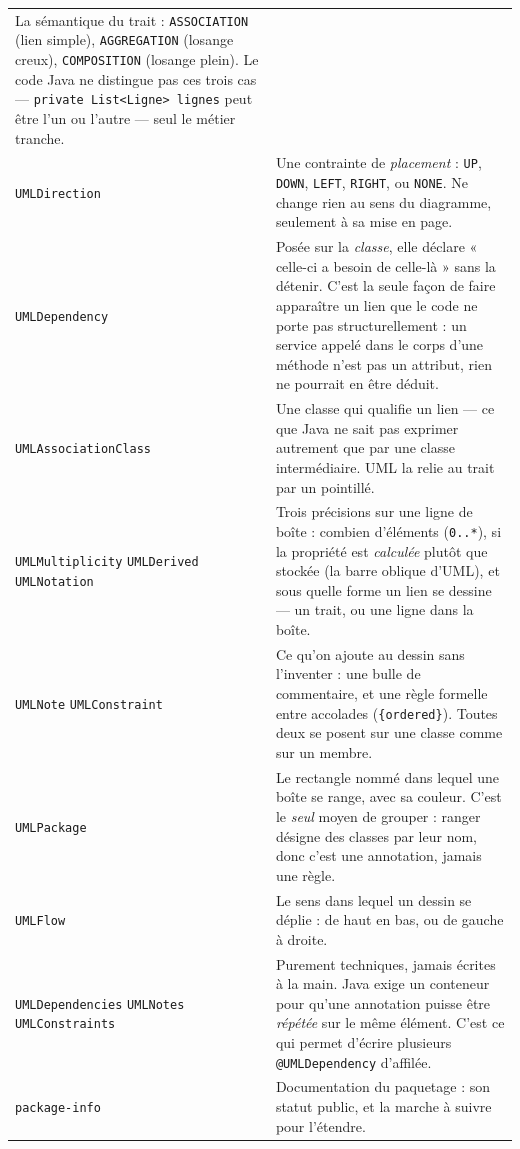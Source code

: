 \documentclass[12pt, a4paper]{article}
\begin{document}
\begin{longtable}{L{4.2cm} L{10cm}}
La sémantique du trait : \texttt{ASSOCIATION} (lien simple), \texttt{AGGREGATION} (losange
creux), \texttt{COMPOSITION} (losange plein). Le code Java ne distingue pas ces trois cas —
\texttt{private List<Ligne> lignes} peut être l'un ou l'autre — seul le métier tranche. \\
\addlinespace
\texttt{UMLDirection} &
Une contrainte de \emph{placement} : \texttt{UP}, \texttt{DOWN}, \texttt{LEFT}, \texttt{RIGHT},
ou \texttt{NONE}. Ne change rien au sens du diagramme, seulement à sa mise en page. \\
\addlinespace
\texttt{UMLDependency} &
Posée sur la \emph{classe}, elle déclare « celle-ci a besoin de celle-là » sans la détenir.
C'est la seule façon de faire apparaître un lien que le code ne porte pas structurellement :
un service appelé dans le corps d'une méthode n'est pas un attribut, rien ne pourrait en être
déduit. \\
\addlinespace
\texttt{UMLAssociationClass} &
Une classe qui qualifie un lien — ce que Java ne sait pas exprimer autrement que par une classe
intermédiaire. UML la relie au trait par un pointillé. \\
\addlinespace
\texttt{UMLMultiplicity} \newline \texttt{UMLDerived} \newline \texttt{UMLNotation} &
Trois précisions sur une ligne de boîte : combien d'éléments (\texttt{0..*}), si la propriété est
\emph{calculée} plutôt que stockée (la barre oblique d'UML), et sous quelle forme un lien se
dessine — un trait, ou une ligne dans la boîte. \\
\addlinespace
\texttt{UMLNote} \newline \texttt{UMLConstraint} &
Ce qu'on ajoute au dessin sans l'inventer : une bulle de commentaire, et une règle formelle entre
accolades (\texttt{\{ordered\}}). Toutes deux se posent sur une classe comme sur un membre. \\
\addlinespace
\texttt{UMLPackage} &
Le rectangle nommé dans lequel une boîte se range, avec sa couleur. C'est le \emph{seul} moyen de
grouper : ranger désigne des classes par leur nom, donc c'est une annotation, jamais une règle. \\
\addlinespace
\texttt{UMLFlow} &
Le sens dans lequel un dessin se déplie : de haut en bas, ou de gauche à droite. \\
\addlinespace
\texttt{UMLDependencies} \newline \texttt{UMLNotes} \newline \texttt{UMLConstraints} &
Purement techniques, jamais écrites à la main. Java exige un conteneur pour qu'une annotation
puisse être \emph{répétée} sur le même élément. C'est ce qui permet d'écrire plusieurs
\texttt{@UMLDependency} d'affilée. \\
\addlinespace
\texttt{package-info} &
Documentation du paquetage : son statut public, et la marche à suivre pour l'étendre. \\
\bottomrule
\end{longtable}
\end{document}
